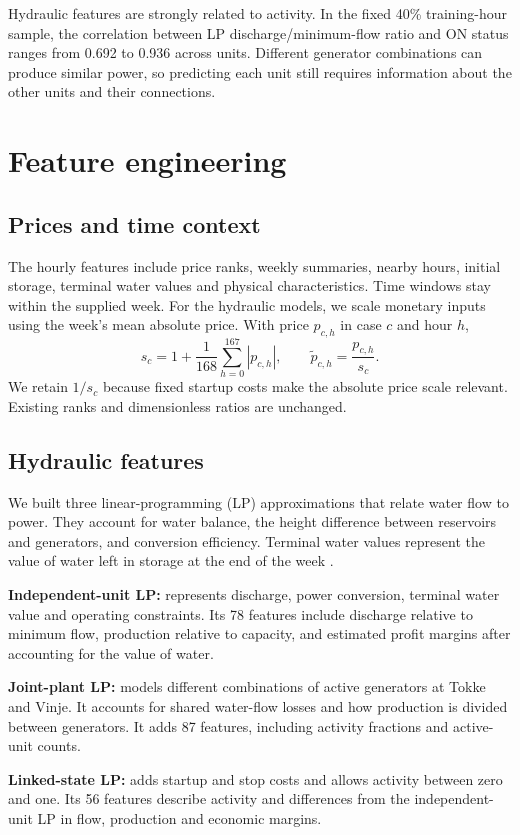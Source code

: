 \documentclass[a4paper,11pt]{article}
\begin{document}
Hydraulic features are strongly related to activity. In the fixed 40\% training-hour sample, the correlation between LP discharge/minimum-flow ratio and ON status ranges from 0.692 to 0.936 across units. Different generator combinations can produce similar power, so predicting each unit still requires information about the other units and their connections.

\section{Feature engineering}\label{features}
\subsection*{Prices and time context}
The hourly features include price ranks, weekly summaries, nearby hours, initial storage, terminal water values and physical characteristics. Time windows stay within the supplied week. For the hydraulic models, we scale monetary inputs using the week's mean absolute price. With price $p_{c,h}$ in case $c$ and hour $h$,
\[
 s_c=1+\frac{1}{168}\sum_{h=0}^{167}|p_{c,h}|,
 \qquad \widetilde p_{c,h}=\frac{p_{c,h}}{s_c}.
\]
We retain $1/s_c$ because fixed startup costs make the absolute price scale relevant. Existing ranks and dimensionless ratios are unchanged.

\subsection*{Hydraulic features}
We built three linear-programming (LP) approximations that relate water flow to power. They account for water balance, the height difference between reservoirs and generators, and conversion efficiency. Terminal water values represent the value of water left in storage at the end of the week \cite{data}.

\textbf{Independent-unit LP:} represents discharge, power conversion, terminal water value and operating constraints. Its 78 features include discharge relative to minimum flow, production relative to capacity, and estimated profit margins after accounting for the value of water.

\textbf{Joint-plant LP:} models different combinations of active generators at Tokke and Vinje. It accounts for shared water-flow losses and how production is divided between generators. It adds 87 features, including activity fractions and active-unit counts.

\textbf{Linked-state LP:} adds startup and stop costs and allows activity between zero and one. Its 56 features describe activity and differences from the independent-unit LP in flow, production and economic margins.
\end{document}
